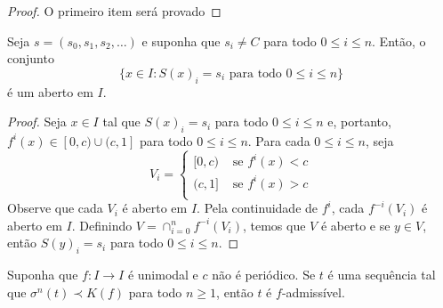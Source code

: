 \begin{proof}
O primeiro item será provado 
\end{proof}

\begin{lemma}
Seja $s = (s_0, s_1, s_2, \dots)$ e suponha que $s_i \neq C$ para todo $0 \leq i \leq n$. Então, o conjunto
$$\{ x \in I : S(x)_i = s_i \textrm{ para todo } 0 \leq i \leq n \}$$
é um aberto em $I$.
\end{lemma}

\begin{proof}
Seja $x \in I$ tal que $S(x)_i = s_i$ para todo $0 \leq i \leq n$ e, portanto, $f^i(x) \in [0,c) \cup (c, 1]$ para todo $0 \leq i \leq n$. Para cada $0 \leq i \leq n$, seja
\[ V_i = 
\begin{cases} 
  [0, c) & \textrm{ se } f^i(x) < c \\
  (c, 1] & \textrm{ se } f^i(x) > c \\
\end{cases}
\]
Observe que cada $V_i$ é aberto em $I$. Pela continuidade de $f^i$, cada $f^{-i}(V_i)$ é aberto em $I$. Definindo $V = \cap_{i=0}^n f^{-i}(V_i)$, temos que $V$ é aberto e se $y \in V$, então $S(y)_i = s_i$ para todo $0 \leq i \leq n$.  
\end{proof}

\begin{theorem}
Suponha que $f: I \to I$ é unimodal e $c$ não é periódico. Se $t$ é uma sequência tal que $\sigma^n(t) \prec K(f)$ para todo $n \geq 1$, então $t$ é $f$-admissível.
\end{theorem}